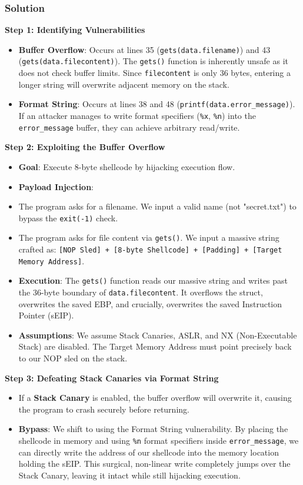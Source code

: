 \documentclass{article}
\begin{document}
\subsubsection*{Solution}
\textbf{Step 1: Identifying Vulnerabilities}
\begin{itemize}
    \item[\textbf{1.}] \textbf{Buffer Overflow}: Occurs at lines 35 (\texttt{gets(data.filename)}) and 43 (\texttt{gets(data.filecontent)}). The \texttt{gets()} function is inherently unsafe as it does not check buffer limits. Since \texttt{filecontent} is only 36 bytes, entering a longer string will overwrite adjacent memory on the stack.
    \item[\textbf{2.}] \textbf{Format String}: Occurs at lines 38 and 48 (\texttt{printf(data.error\_message)}). If an attacker manages to write format specifiers (\texttt{\%x}, \texttt{\%n}) into the \texttt{error\_message} buffer, they can achieve arbitrary read/write.

\end{itemize}
\textbf{Step 2: Exploiting the Buffer Overflow}
\begin{itemize}
    \item \textbf{Goal}: Execute 8-byte shellcode by hijacking execution flow.
    \item \textbf{Payload Injection}:
    \item[\textbf{1.}] The program asks for a filename. We input a valid name (not "secret.txt") to bypass the \texttt{exit(-1)} check.
    \item[\textbf{2.}] The program asks for file content via \texttt{gets()}. We input a massive string crafted as: \texttt{[NOP Sled] + [8-byte Shellcode] + [Padding] + [Target Memory Address]}.
    \item \textbf{Execution}: The \texttt{gets()} function reads our massive string and writes past the 36-byte boundary of \texttt{data.filecontent}. It overflows the struct, overwrites the saved EBP, and crucially, overwrites the saved Instruction Pointer (sEIP).
    \item \textbf{Assumptions}: We assume Stack Canaries, ASLR, and NX (Non-Executable Stack) are disabled. The Target Memory Address must point precisely back to our NOP sled on the stack.

\end{itemize}
\textbf{Step 3: Defeating Stack Canaries via Format String}
\begin{itemize}
    \item If a \textbf{Stack Canary} is enabled, the buffer overflow will overwrite it, causing the program to crash securely before returning.
    \item \textbf{Bypass}: We shift to using the Format String vulnerability. By placing the shellcode in memory and using \texttt{\%n} format specifiers inside \texttt{error\_message}, we can directly write the address of our shellcode into the memory location holding the sEIP. This surgical, non-linear write completely jumps over the Stack Canary, leaving it intact while still hijacking execution.
\end{itemize}
\end{document}
